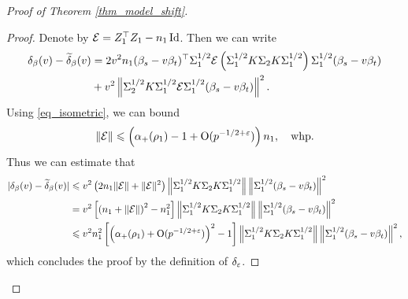 \begin{proof}[Proof of Theorem \ref{thm_model_shift}]
\begin{proof}
	Denote by $\mathcal{E} = Z_1^{\top}Z_1 - {n_1}\operatorname{Id}$. Then we can write
	\begin{align}
		 \delta_\beta(v)-\widetilde\delta_\beta(v)&= {2v^2n_1}(\beta_s - v\beta_t)^{\top}\Sigma_1^{1/2} \mathcal{E}\left(\Sigma_1^{1/2}K \Sigma_2 K \Sigma_1^{1/2}\right) \Sigma_1^{1/2} (\beta_s - v\beta_t) \nonumber
		\\
		&+ v^2\left\| \Sigma_2^{1/2} K \Sigma_1^{1/2}\mathcal{E} \Sigma_1^{1/2}(\beta_s - v\beta_t) \right\|^2. \label{eq_lem_model_shift_1}
	\end{align}
	Using \eqref{eq_isometric}, we can bound  
	$$\|\mathcal E\|\leqslant \left( \alpha_+(\rho_1)-1 + \operatorname{O}(p^{-1/2+{\varepsilon}})\right)n_1, \quad \text{whp}.$$
	Thus we can estimate that 
	\begin{align*}
	| \delta_\beta(v)-\widetilde\delta_\beta(v)|&\leqslant v^2 \left( 2n_1  \|\mathcal E\| +  \|\mathcal E\|^2 \right) \left\| \Sigma_1^{1/2} K \Sigma_2 K \Sigma_1^{1/2} \right\| \left\| \Sigma_1^{1/2} (\beta_s - v\beta_t) \right\|^2 \\
	&=  v^2 \left[\left( n_1 + \|\mathcal E\|\right)^2 -n_1^2 \right] \left\| \Sigma_1^{1/2} K \Sigma_2 K \Sigma_1^{1/2} \right\| \left\| \Sigma_1^{1/2} (\beta_s - v\beta_t) \right\|^2 \\
	& \leqslant v^2 n_1^2 \left[\left( \alpha_+(\rho_1) + \operatorname{O}(p^{-1/2+{\varepsilon}})\right)^2-1\right]\left\| \Sigma_1^{1/2} K \Sigma_2 K \Sigma_1^{1/2} \right\| \left\| \Sigma_1^{1/2} (\beta_s - v\beta_t) \right\|^2,
	\end{align*}
	which concludes the proof by the definition of $\delta_{\varepsilon}$.	

\end{proof}
\end{proof}
